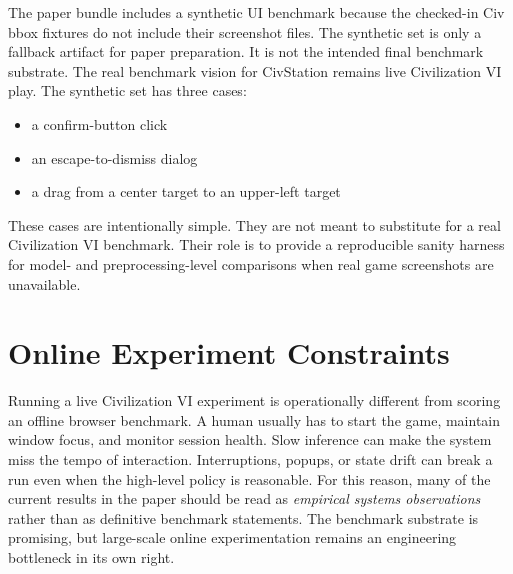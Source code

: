 The paper bundle includes a synthetic UI benchmark because the checked-in Civ bbox fixtures do not include their screenshot files. The synthetic set is only a fallback artifact for paper preparation. It is not the intended final benchmark substrate. The real benchmark vision for CivStation remains live Civilization VI play. The synthetic set has three cases:
\begin{itemize}[leftmargin=*]
    \item a confirm-button click
    \item an escape-to-dismiss dialog
    \item a drag from a center target to an upper-left target
\end{itemize}
These cases are intentionally simple. They are not meant to substitute for a real Civilization VI benchmark. Their role is to provide a reproducible sanity harness for model- and preprocessing-level comparisons when real game screenshots are unavailable.

\section{Online Experiment Constraints}

Running a live Civilization VI experiment is operationally different from scoring an offline browser benchmark. A human usually has to start the game, maintain window focus, and monitor session health. Slow inference can make the system miss the tempo of interaction. Interruptions, popups, or state drift can break a run even when the high-level policy is reasonable. For this reason, many of the current results in the paper should be read as \emph{empirical systems observations} rather than as definitive benchmark statements. The benchmark substrate is promising, but large-scale online experimentation remains an engineering bottleneck in its own right.
